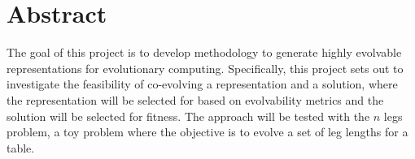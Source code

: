 \section{Abstract} \label{sec:abstract}

The goal of this project is to develop methodology to generate highly evolvable representations for evolutionary computing.
Specifically, this project sets out to investigate the feasibility of co-evolving a representation and a solution, where the representation will be selected for based on evolvability metrics and the solution will be selected for fitness.
The approach will be tested with the $n$ legs problem, a toy problem where the objective is to evolve a set of leg lengths for a table.
